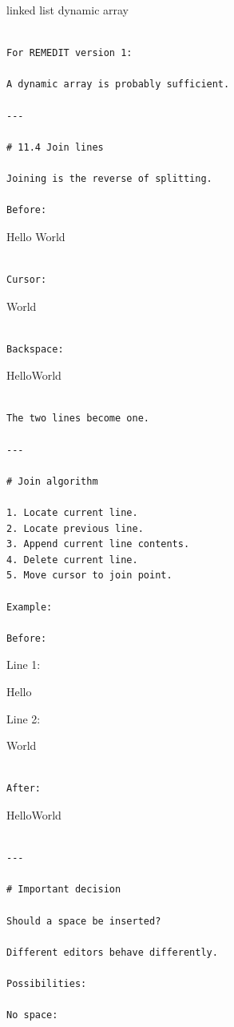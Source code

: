 \documentclass[
  oneside,
  openany]{book}
\begin{document}
linked list dynamic array

\begin{verbatim}

For REMEDIT version 1:

A dynamic array is probably sufficient.

---

# 11.4 Join lines

Joining is the reverse of splitting.

Before:
\end{verbatim}

Hello World

\begin{verbatim}

Cursor:
\end{verbatim}

\textbar World

\begin{verbatim}

Backspace:
\end{verbatim}

HelloWorld

\begin{verbatim}

The two lines become one.

---

# Join algorithm

1. Locate current line.
2. Locate previous line.
3. Append current line contents.
4. Delete current line.
5. Move cursor to join point.

Example:

Before:
\end{verbatim}

Line 1:

Hello

Line 2:

World

\begin{verbatim}

After:
\end{verbatim}

HelloWorld

\begin{verbatim}

---

# Important decision

Should a space be inserted?

Different editors behave differently.

Possibilities:

No space:
\end{verbatim}
\end{document}
